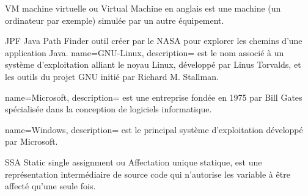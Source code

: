 


    {VM}
    {machine virtuelle}
    { ou Virtual Machine en anglais est une machine (un ordinateur par exemple) simulée par un autre équipement.}
    
    {JPF}
    {Java Path Finder}
    { outil créer par le NASA pour explorer les chemins d'une application Java.}
{
        name=GNU-Linux,
        description={ est le nom associé à un système d'exploitation alliant le noyau Linux, développé par Linus Torvalds, et les outils du projet GNU initié par Richard M. Stallman.}
}

{
        name=Microsoft,
        description={ est une entreprise fondée en 1975 par Bill Gates spécialisée dans la conception de logiciels informatique.}
}

{
        name=Windows,
        description={ est le principal système d'exploitation développé par Microsoft.}
}

	{SSA}
	{Static single assignment}
	{ ou Affectation unique statique, est une représentation intermédiaire de source code qui n'autorise les variable à être affecté qu'une seule fois.}

 
